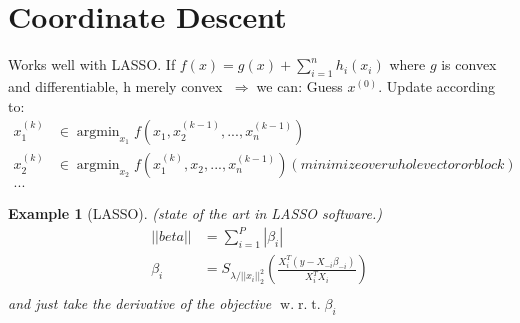 \documentclass[10pt]{article}
\newtheorem{example}[ex]{Example}
\DeclareMathOperator*{\argmin}{argmin}
\newcommand{\wrt}{\ensuremath{\;\mathrm{w.}\;\mathrm{r.}\;\mathrm{t.}\;}}
\newcommand{\then}{\ensuremath{\;\Rightarrow\;}}
\begin{document}
\section{Coordinate Descent}
Works well with LASSO.%
If $f(x)=g(x)+\sum_{i=1}^nh_i(x_i)$ where $g$ is convex and differentiable, h merely convex
\then we can:
Guess $x^{(0)}$.  Update according to:
\begin{align*}
x_1^{(k)}&\in \argmin_{x_1} f(x_1,x_2^{(k-1)},...,x_n^{(k-1)})\\
x_2^{(k)}&\in \argmin_{x_2} f(x_1^{(k)},x_2,...,x_n^{(k-1)}) (minimize over whole vector or block)\\
...&
\end{align*}


\begin{example}[LASSO]
  (state of the art in LASSO software.)
  \begin{align*}
    ||beta||&=\sum_{i=1}^P|\beta_i|\\
    \beta_i&=S_{\lambda/||x_i||_2^2}(\frac{X_i^T(y-X_{-i}\beta_{-i})}{X_i^TX_i})\\
    \end{align*}
  and just take the derivative of the objective \wrt $\beta_i$
\end{example}



\end{document}
